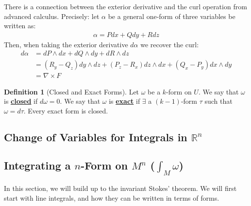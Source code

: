 \documentclass[11pt]{scrartcl}
\newcommand{\R}[0]{\mathbb{R}}
\theoremstyle{definition}
\newtheorem{definition}{Definition}
\theoremstyle{remark}
\newcommand{\dfn}[1]{\textbf{\underline{#1}}}
\newcommand{\idx}[2]{\int_{#1}^{#2}}
\begin{document}
{There is a connection between the exterior derivative and the curl operation from advanced calculus. Precisely: let $\alpha$ be a general one-form of three variables be written as: 
\begin{align*}
	\alpha = Pdx + Q dy + R dz 
\end{align*}
Then, when taking the exterior derivative $d \alpha$ we recover the curl: 
\begin{align*}
	d \alpha & = d P \wedge dx + dQ \wedge dy + d R \wedge dz \\
	& = (R_y - Q_z) dy \wedge dz + (P_z - R_x) dz \wedge dx + (Q_x - P_y) dx \wedge dy \\
	& = \nabla \times F 
\end{align*}
\begin{definition}[Closed and Exact Forms]
	Let $\omega$ be a $k$-form on $U$. We say that $\omega$ is \dfn{closed} if $d\omega =0$. We say that $\omega$ is \dfn{exact} if $\exists$ a $(k-1)$-form $\tau$ such that $\omega = d \tau$. Every exact form is closed. 
\end{definition}


\subsection{Change of Variables for Integrals in $\R^n$}

\subsection{Integrating a $n$-Form on $M^n$ ($\idx{M}{} \omega$)} 
In this section, we will build up to the invariant Stokes' theorem. We will first start with line integrals, and how they can be written in terms of forms. 

}
\end{document}
